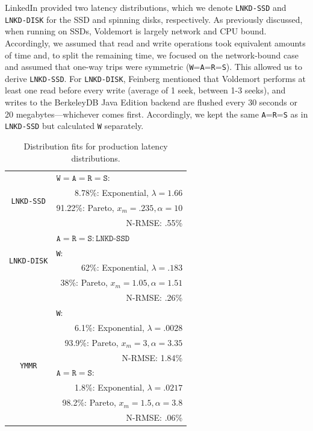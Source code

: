 \documentclass{vldb}
\begin{document}
LinkedIn provided two latency distributions, which we denote
\texttt{LNKD-SSD} and \texttt{LNKD-DISK} for the SSD and spinning
disks, respectively.  As previously discussed, when running on SSDs,
Voldemort is largely network and CPU bound.  Accordingly, we assumed
that read and write operations took equivalent amounts of time and, to
split the remaining time, we focused on the network-bound case and
assumed that one-way trips were symmetric
(\texttt{W}=\texttt{A}=\texttt{R}=\texttt{S}).  This allowed us to
derive \texttt{LNKD-SSD}.  For \texttt{LNKD-DISK}, Feinberg mentioned
that Voldemort performs at least one read before every write (average
of 1 seek, between 1-3 seeks), and writes to the BerkeleyDB Java
Edition backend are flushed every 30 seconds or 20
megabytes---whichever comes first.  Accordingly, we kept the same
\texttt{A}=\texttt{R}=\texttt{S} as in \texttt{LNKD-SSD} but
calculated \texttt{W} separately.  

\begin{table}
\centering
\begin{tabular}{|c|r|}
\hline
\multirow{4}{*}{\texttt{LNKD-SSD}} & \multicolumn{1}{|l|}{$\texttt{W} = \texttt{A}= \texttt{R} = \texttt{S}:$} \\
& 8.78\%: Exponential, $\lambda = 1.66$ \\
& 91.22\%: Pareto, $x_m=.235, \alpha=10$\\
& N-RMSE: .55\%\\\hline
\multirow{4}{*}{\texttt{LNKD-DISK}} & \multicolumn{1}{|l|}{$\texttt{A}= \texttt{R} = \texttt{S}: \texttt{LNKD-SSD}$}\\\cline{2-2}
& \multicolumn{1}{|l|}{\texttt{W}:}\\
& \hfill 62\%: Exponential, $\lambda = .183$ \\
& 38\%: Pareto, $x_m=1.05, \alpha=1.51$\\
& N-RMSE: .26\%\\
\hline
\multirow{8}{*}{\texttt{YMMR}} & \multicolumn{1}{|l|}{\texttt{W}:} \\
& 6.1\%: Exponential, $\lambda = .0028$ \\
& 93.9\%: Pareto, $x_m=3, \alpha=3.35$\\
& N-RMSE: 1.84\%\\\cline{2-2}
& \multicolumn{1}{|l|}{$\texttt{A}= \texttt{R} = \texttt{S}:$}\\
& 1.8\%: Exponential, $\lambda=.0217$\\
& 98.2\%: Pareto, $x_m=1.5, \alpha=3.8$\\
& N-RMSE: .06\%\\
\hline
\end{tabular}
\caption{Distribution fits for production latency distributions.}
\label{table:fits}
\end{table}
\end{document}
